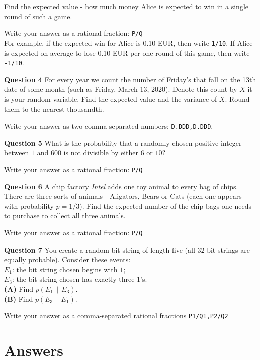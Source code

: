 \documentclass[jou]{apa6}
\begin{document}
Find the expected value - how much money Alice is expected to win in a single round of such a game.

Write your answer as a rational fraction: {\tt P/Q}\\
For example, if the expected win for Alice is 0.10 EUR, then write {\tt 1/10}. If Alice is expected on average to lose 0.10 EUR
per one round of this game, then write {\tt -1/10}. 




\vspace{10pt}
{\bf Question 4} For every year we count the number of Friday's that fall on the 13th date of some month
(such as Friday, March 13, 2020). Denote this count by $X$ \textendash{} it is your random variable.
Find the expected value and the variance of $X$. Round them to the nearest thousandth. 

Write your answer as two comma-separated numbers: {\tt D.DDD,D.DDD}.

\vspace{10pt}
{\bf Question 5} What is the
probability that a randomly chosen positive integer between $1$ and $600$ is not divisible 
by either $6$ or $10$?

Write your answer as a rational fraction: {\tt P/Q}


\vspace{10pt}
{\bf Question 6} A chip factory {\em Intel} adds one toy animal to every bag of chips.
There are three sorts of animals - Aligators, Bears or Cats (each one appears with probability $p=1/3$). 
Find the expected number of the chip bags one needs to purchase to collect all three animals.

Write your answer as a rational fraction: {\tt P/Q}

\vspace{10pt}
{\bf Question 7} You create a random bit string of length five (all $32$ bit strings are equally probable). Consider
these events:\\
$E_1$: the bit string chosen begins with $1$;\\
$E_3$: the bit string chosen has exactly three $1$’s.\\
{\bf (A)} Find $p(E_1 \,\mid\, E_3)$.\\
{\bf (B)} Find $p(E_3 \,\mid\, E_1)$.

Write your answer as a comma-separated rational fractions {\tt P1/Q1,P2/Q2}


\newpage

\section{Answers}
\end{document}
